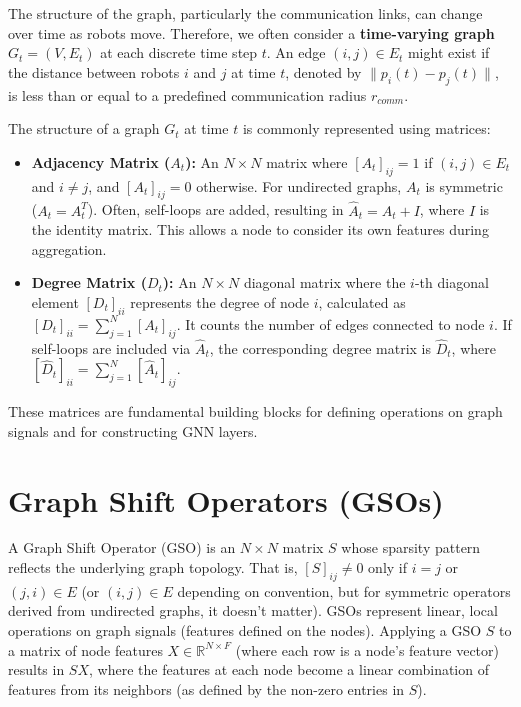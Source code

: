 The structure of the graph, particularly the communication links, can change over time as robots move. Therefore, we often consider a \textbf{time-varying graph} $G_t = (V, E_t)$ at each discrete time step $t$. An edge $(i, j) \in E_t$ might exist if the distance between robots $i$ and $j$ at time $t$, denoted by $\|p_i(t) - p_j(t)\|$, is less than or equal to a predefined communication radius $r_{comm}$.

The structure of a graph $G_t$ at time $t$ is commonly represented using matrices:

\begin{itemize}
    \item \textbf{Adjacency Matrix ($A_t$):} An $N \times N$ matrix where $[A_t]_{ij} = 1$ if $(i, j) \in E_t$ and $i \neq j$, and $[A_t]_{ij} = 0$ otherwise. For undirected graphs, $A_t$ is symmetric ($A_t = A_t^T$). Often, self-loops are added, resulting in $\hat{A}_t = A_t + I$, where $I$ is the identity matrix. This allows a node to consider its own features during aggregation.
    \item \textbf{Degree Matrix ($D_t$):} An $N \times N$ diagonal matrix where the $i$-th diagonal element $[D_t]_{ii}$ represents the degree of node $i$, calculated as $[D_t]_{ii} = \sum_{j=1}^{N} [A_t]_{ij}$. It counts the number of edges connected to node $i$. If self-loops are included via $\hat{A}_t$, the corresponding degree matrix is $\hat{D}_t$, where $[\hat{D}_t]_{ii} = \sum_{j=1}^{N} [\hat{A}_t]_{ij}$.
\end{itemize}

These matrices are fundamental building blocks for defining operations on graph signals and for constructing GNN layers.

\section{Graph Shift Operators (GSOs)}
\label{sec:gsos}

A Graph Shift Operator (GSO) is an $N \times N$ matrix $S$ whose sparsity pattern reflects the underlying graph topology. That is, $[S]_{ij} \neq 0$ only if $i=j$ or $(j, i) \in E$ (or $(i,j) \in E$ depending on convention, but for symmetric operators derived from undirected graphs, it doesn't matter). GSOs represent linear, local operations on graph signals (features defined on the nodes). Applying a GSO $S$ to a matrix of node features $X \in \mathbb{R}^{N \times F}$ (where each row is a node's feature vector) results in $SX$, where the features at each node become a linear combination of features from its neighbors (as defined by the non-zero entries in $S$).

